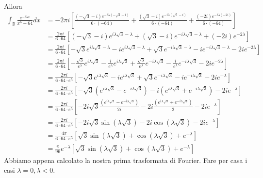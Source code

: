 Allora
\begin{align*}
\int _{\mathbb{R}}\frac{e^{-i\lambda x}}{x^{6} +64} dx & =-2\pi i\left[\frac{\left( -\sqrt{3} -i\right) e^{-i\lambda \left( -\sqrt{3} -i\right)}}{6\cdotp \left( -64\right)} +\frac{\left(\sqrt{3} -i\right) e^{-i\lambda \left(\sqrt{3} -i\right)}}{6\cdotp \left( -64\right)} +\frac{\left( -2i\right) e^{-i\lambda \left( -2i\right)}}{6\cdotp \left( -64\right)}\right]\\
 & =\frac{2\pi i}{6\cdotp 64}\left[\left( -\sqrt{3} -i\right) e^{i\lambda \sqrt{3} -\lambda } +\left(\sqrt{3} -i\right) e^{-i\lambda \sqrt{3} -\lambda } +\left( -2i\right) e^{-2\lambda }\right]\\
 & =\frac{2\pi i}{6\cdotp 64}\left[ -\sqrt{3} e^{i\lambda \sqrt{3} -\lambda } -ie^{i\lambda \sqrt{3} -\lambda } +\sqrt{3} e^{-i\lambda \sqrt{3} -\lambda } -ie^{-i\lambda \sqrt{3} -\lambda } -2ie^{-2\lambda }\right]\\
 & =\frac{2\pi i}{6\cdotp 64}\left[ -\frac{\sqrt{3}}{e^{\lambda }} e^{i\lambda \sqrt{3}} -\frac{i}{e^{\lambda }} e^{i\lambda \sqrt{3}} +\frac{\sqrt{3}}{e^{\lambda }} e^{-i\lambda \sqrt{3}} -\frac{i}{e^{\lambda }} e^{-i\lambda \sqrt{3}} -2ie^{-2\lambda }\right]\\
 & =\frac{2\pi i}{6\cdotp 64\cdotp e^{\lambda }}\left[ -\sqrt{3} e^{i\lambda \sqrt{3}} -ie^{i\lambda \sqrt{3}} +\sqrt{3} e^{-i\lambda \sqrt{3}} -ie^{-i\lambda \sqrt{3}} -2ie^{-\lambda }\right]\\
 & =\frac{2\pi i}{6\cdotp 64\cdotp e^{\lambda }}\left[ -\sqrt{3}\left( e^{i\lambda \sqrt{3}} -e^{-i\lambda \sqrt{3}}\right) -i\left( e^{i\lambda \sqrt{3}} +e^{-i\lambda \sqrt{3}}\right) -2ie^{-\lambda }\right]\\
 & =\frac{2\pi i}{6\cdotp 64\cdotp e^{\lambda }}\left[ -2i\sqrt{3}\frac{\left( e^{i\lambda \sqrt{3}} -e^{-i\lambda \sqrt{3}}\right)}{2i} -2i\frac{\left( e^{i\lambda \sqrt{3}} +e^{-i\lambda \sqrt{3}}\right)}{2} -2ie^{-\lambda }\right]\\
 & =\frac{2\pi i}{6\cdotp 64\cdotp e^{\lambda }}\left[ -2i\sqrt{3}\sin\left( \lambda \sqrt{3}\right) -2i\cos\left( \lambda \sqrt{3}\right) -2ie^{-\lambda }\right]\\
 & =\frac{4\pi }{6\cdotp 64\cdotp e^{\lambda }}\left[\sqrt{3}\sin\left( \lambda \sqrt{3}\right) +\cos\left( \lambda \sqrt{3}\right) +e^{-\lambda }\right]\\
 & =\frac{\pi }{96} e^{-\lambda }\left[\sqrt{3}\sin\left( \lambda \sqrt{3}\right) +\cos\left( \lambda \sqrt{3}\right) +e^{-\lambda }\right]
\end{align*}
Abbiamo appena calcolato la nostra prima trasformata di Fourier. Fare per casa i casi $\lambda =0,\lambda < 0$.
\Soluzione

